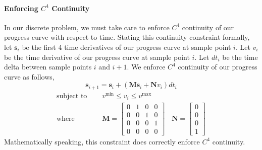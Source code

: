 

\paragraph{Enforcing $C^4$ Continuity}

In our discrete problem, we must take care to enforce $C^4$ continuity of our progress curve with respect to time.
Stating this continuity constraint formally, let $\mathbf{s}_i$ be the first 4 time derivatives of our progress curve at sample point $i$.
Let $v_i$ be the  time derivative of our progress curve at sample point $i$.
Let $dt_i$ be the time delta between sample points $i$ and $i+1$.
We enforce $C^4$ continuity of our progress curve as follows,
%
\begin{equation*}
\mathbf{s}_{i+1} = \mathbf{s}_{i} + (\mathbf{M}\mathbf{s}_{i} + \mathbf{N}v_{i})dt_i
\end{equation*}
%
\begin{equation}
\begin{aligned}
\text{subject to~~~~} & v^{\text{min}} \leq v_i \leq v^{\text{max}}\\
\text{where~~~~}      &
\mathbf{M} =
\begin{bmatrix}
0 & 1 & 0 & 0 \\
0 & 0 & 1 & 0 \\
0 & 0 & 0 & 1 \\
0 & 0 & 0 & 0
\end{bmatrix}
~~~~
\mathbf{N} =
\begin{bmatrix}
0 \\
0 \\
0 \\
1
\end{bmatrix}
\label{eqn:ch3:sip1}
\end{aligned}
\end{equation}
%
Mathematically speaking, this constraint does correctly enforce $C^4$ continuity.
